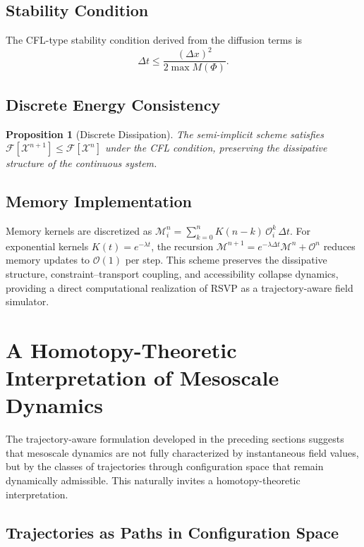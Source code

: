 \documentclass[11pt, a4paper, twocolumn]{article}
\newtheorem{proposition}[definition]{Proposition}
\newcommand{\X}{\mathcal{X}}
\newcommand{\F}{\mathcal{F}}
\begin{document}
\subsection{Stability Condition}

The CFL-type stability condition derived from the diffusion terms is
\[
    \Delta t \leq \frac{(\Delta x)^2}{2\max M(\Phi)}.
\]

\subsection{Discrete Energy Consistency}

\begin{proposition}[Discrete Dissipation]
The semi-implicit scheme satisfies $\F[\X^{n+1}] \leq \F[\X^n]$ under the
CFL condition, preserving the dissipative structure of the continuous system.
\end{proposition}

\subsection{Memory Implementation}

Memory kernels are discretized as
$\mathcal{M}_i^n = \sum_{k=0}^{n} K(n-k)\,\mathcal{O}_i^k\,\Delta t$.
For exponential kernels $K(t) = e^{-\lambda t}$, the recursion
$\mathcal{M}^{n+1} = e^{-\lambda\Delta t}\mathcal{M}^n + \mathcal{O}^n$
reduces memory updates to $\mathcal{O}(1)$ per step. This scheme preserves
the dissipative structure, constraint--transport coupling, and accessibility
collapse dynamics, providing a direct computational realization of RSVP as a
trajectory-aware field simulator.

\section{A Homotopy-Theoretic Interpretation of Mesoscale Dynamics}

The trajectory-aware formulation developed in the preceding sections suggests
that mesoscale dynamics are not fully characterized by instantaneous field
values, but by the classes of trajectories through configuration space that
remain dynamically admissible. This naturally invites a homotopy-theoretic
interpretation.

\subsection{Trajectories as Paths in Configuration Space}
\end{document}
